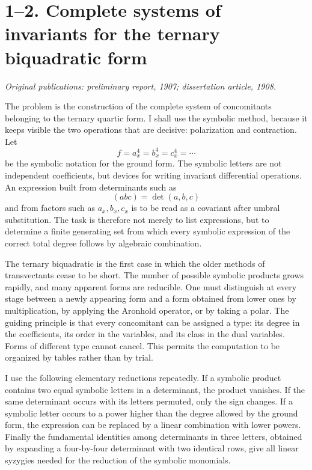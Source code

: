 \documentclass[11pt]{article}
\begin{document}
\section{1--2. Complete systems of invariants for the ternary biquadratic form}

\textit{Original publications: preliminary report, 1907; dissertation article, 1908.}

The problem is the construction of the complete system of concomitants belonging to the ternary
quartic form. I shall use the symbolic method, because it keeps visible the two operations that are
decisive: polarization and contraction. Let \[   f=a_x^4=b_x^4=c_x^4=\cdots \] be the symbolic
notation for the ground form. The symbolic letters are not independent coefficients, but devices for
writing invariant differential operations. An expression built from determinants such as \[
(abc)=\det(a,b,c) \] and from factors such as \(a_x,b_x,c_x\) is to be read as a covariant after
umbral substitution. The task is therefore not merely to list expressions, but to determine a finite
generating set from which every symbolic expression of the correct total degree follows by algebraic
combination.


The ternary biquadratic is the first case in which the older methods of transvectants cease to be
short. The number of possible symbolic products grows rapidly, and many apparent forms are
reducible. One must distinguish at every stage between a newly appearing form and a form obtained
from lower ones by multiplication, by applying the Aronhold operator, or by taking a polar. The
guiding principle is that every concomitant can be assigned a type: its degree in the coefficients,
its order in the variables, and its class in the dual variables. Forms of different type cannot
cancel. This permits the computation to be organized by tables rather than by trial.


I use the following elementary reductions repeatedly. If a symbolic product contains two equal
symbolic letters in a determinant, the product vanishes. If the same determinant occurs with its
letters permuted, only the sign changes. If a symbolic letter occurs to a power higher than the
degree allowed by the ground form, the expression can be replaced by a linear combination with lower
powers. Finally the fundamental identities among determinants in three letters, obtained by
expanding a four-by-four determinant with two identical rows, give all linear syzygies needed for
the reduction of the symbolic monomials.
\end{document}
